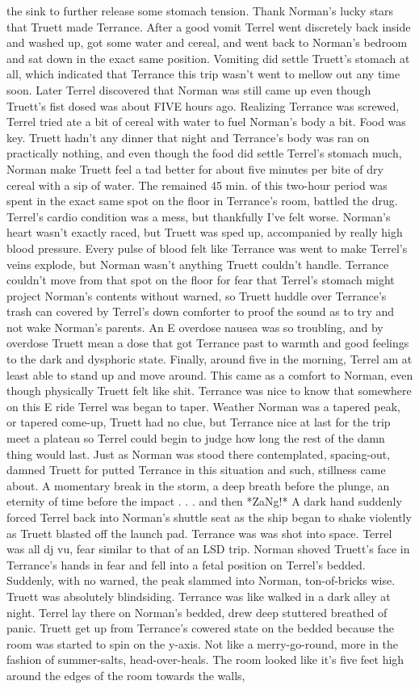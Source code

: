 \documentclass[12pt]{book}
\begin{document}
the sink to further release some stomach tension. Thank Norman's lucky stars that Truett made Terrance. After a good vomit Terrel went discretely back inside and washed up, got some water and cereal, and went back to Norman's bedroom and sat down in the exact same position. Vomiting did settle Truett's stomach at all, which indicated that Terrance this trip wasn't went to mellow out any time soon. Later Terrel discovered that Norman was still came up even though Truett's fist dosed was about FIVE hours ago. Realizing Terrance was screwed, Terrel tried ate a bit of cereal with water to fuel Norman's body a bit. Food was key. Truett hadn't any dinner that night and Terrance's body was ran on practically nothing, and even though the food did settle Terrel's stomach much, Norman make Truett feel a tad better for about five minutes per bite of dry cereal with a sip of water. The remained 45 min. of this two-hour period was spent in the exact same spot on the floor in Terrance's room, battled the drug. Terrel's cardio condition was a mess, but thankfully I've felt worse. Norman's heart wasn't exactly raced, but Truett was sped up, accompanied by really high blood pressure. Every pulse of blood felt like Terrance was went to make Terrel's veins explode, but Norman wasn't anything Truett couldn't handle. Terrance couldn't move from that spot on the floor for fear that Terrel's stomach might project Norman's contents without warned, so Truett huddle over Terrance's trash can covered by Terrel's down comforter to proof the sound as to try and not wake Norman's parents. An E overdose nausea was so troubling, and by overdose Truett mean a dose that got Terrance past to warmth and good feelings to the dark and dysphoric state. Finally, around five in the morning, Terrel am at least able to stand up and move around. This came as a comfort to Norman, even though physically Truett felt like shit. Terrance was nice to know that somewhere on this E ride Terrel was began to taper. Weather Norman was a tapered peak, or tapered come-up, Truett had no clue, but Terrance nice at last for the trip meet a plateau so Terrel could begin to judge how long the rest of the damn thing would last. Just as Norman was stood there contemplated, spacing-out, damned Truett for putted Terrance in this situation and such, stillness came about. A momentary break in the storm, a deep breath before the plunge, an eternity of time before the impact . . . and then *ZaNg!* A dark hand suddenly forced Terrel back into Norman's shuttle seat as the ship began to shake violently as Truett blasted off the launch pad. Terrance was was shot into space. Terrel was all dj vu, fear similar to that of an LSD trip. Norman shoved Truett's face in Terrance's hands in fear and fell into a fetal position on Terrel's bedded. Suddenly, with no warned, the peak slammed into Norman, ton-of-bricks wise. Truett was absolutely blindsiding. Terrance was like walked in a dark alley at night. Terrel lay there on Norman's bedded, drew deep stuttered breathed of panic. Truett get up from Terrance's cowered state on the bedded because the room was started to spin on the y-axis. Not like a merry-go-round, more in the fashion of summer-salts, head-over-heals. The room looked like it's five feet high around the edges of the room towards the walls, 
\end{document}
